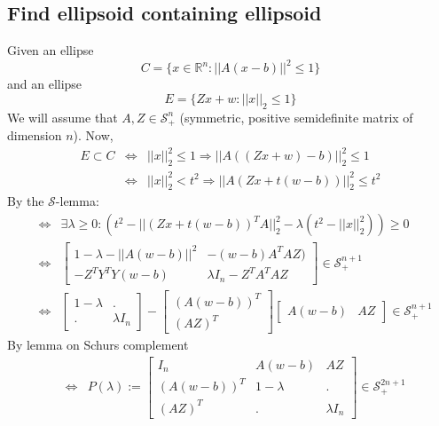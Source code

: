 \documentclass{article}
\begin{document}
\subsection{Find ellipsoid containing ellipsoid}
Given an ellipse 
\[
  C = \{ x\in\mathbb{R}^n : ||A(x-b)||^2 \leq 1 \}
\]
and an ellipse
\[
  E = \{ Zx+w : ||x||_2 \leq 1 \}
\]
We will assume that $A,Z \in\mathcal{S}^n_+$ (symmetric, positive semidefinite matrix of dimension $n$).
Now, 
\begin{eqnarray}
    E \subset C 
    & \Leftrightarrow & ||x||_2^2 \leq 1 \Rightarrow || A((Zx+w)-b) ||_2^2 \leq 1 \\
    & \Leftrightarrow & ||x||_2^2 < t^2 \Rightarrow ||A(Zx+t(w-b))||_2^2 \leq t^2 
\end{eqnarray}
By the $\mathcal{S}$-lemma:
\begin{eqnarray}
    & \Leftrightarrow & \exists\lambda\geq 0: \left( t^2 - || (Zx+t(w-b))^TA ||_2^2 -\lambda(t^2 - ||x||_2^2) \right) \geq 0 \\
    &\Leftrightarrow & 
    \left[
        \begin{array}{cc}
            1-\lambda-|| A(w-b) ||^2 & -(w-b)A^TAZ) \\
            -Z^TY^TY(w-b)            & \lambda I_n - Z^TA^TAZ
        \end{array}
    \right] \in\mathcal{S}^{n+1}_+\\
    &\Leftrightarrow & 
    \left[
        \begin{array}{cc}
            1-\lambda & . \\
            . & \lambda I_n 
        \end{array}
    \right]
    -
    \left[
        \begin{array}{c}
            (A(w-b))^T \\
            (AZ)^T
        \end{array}
    \right]
    \left[
        \begin{array}{cc}
            A(w-b) & AZ
        \end{array}
    \right]\in\mathcal{S}^{n+1}_+
\end{eqnarray}
By lemma on Schurs complement
\begin{eqnarray}
& \Leftrightarrow & 
    P(\lambda) := \left[
        \begin{array}{ccc}
            I_n & A(w-b) & AZ \\
            (A(w-b))^T & 1-\lambda & . \\
            (AZ)^T & . & \lambda I_n
        \end{array}
    \right]\in\mathcal{S}^{2n+1}_+
\end{eqnarray}
\end{document}
